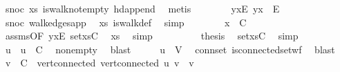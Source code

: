 \begin{isabellebody}
\ snoc\ xs\ is{\isacharunderscore}{\kern0pt}walk{\isacharunderscore}{\kern0pt}not{\isacharunderscore}{\kern0pt}empty{}\ hd{\isacharunderscore}{\kern0pt}append{}\ \isamarkupfalse%
\ metis\isanewline
\ \ \ \ \ \ \isamarkupfalse%
\ yx{\isacharunderscore}{\kern0pt}E{\isacharcolon}{\kern0pt}\ {\isachardoublequoteopen}{\isacharbraceleft}{\kern0pt}y{\isacharcomma}{\kern0pt}x{\isacharbraceright}{\kern0pt}\ {\isasymin}\ E{\isachardoublequoteclose}\ \isamarkupfalse%
\ snoc{\isacharparenleft}{\kern0pt}{}{\isacharparenright}{\kern0pt}\ walk{\isacharunderscore}{\kern0pt}edges{\isacharunderscore}{\kern0pt}app\ \isamarkupfalse%
\ xs\ is{\isacharunderscore}{\kern0pt}walk{\isacharunderscore}{\kern0pt}def\ \isamarkupfalse%
\ simp\isanewline
\ \ \ \ \ \ \isamarkupfalse%
\ {\isachardoublequoteopen}x\ {\isasymin}\ C{\isachardoublequoteclose}\ \isamarkupfalse%
\ assms{\isacharparenleft}{\kern0pt}{}{\isacharparenright}{\kern0pt}{\isacharbrackleft}{\kern0pt}OF\ yx{\isacharunderscore}{\kern0pt}E{\isacharbrackright}{\kern0pt}\ set{\isacharunderscore}{\kern0pt}xs{\isacharunderscore}{\kern0pt}C\ \isamarkupfalse%
\ xs\ \isamarkupfalse%
\ simp\isanewline
\ \ \ \ \ \ \isamarkupfalse%
\ \isamarkupfalse%
\ {\isacharquery}{\kern0pt}thesis\ \isamarkupfalse%
\ set{\isacharunderscore}{\kern0pt}xs{\isacharunderscore}{\kern0pt}C\ \isamarkupfalse%
\ simp\isanewline
\ \ \ \ \isamarkupfalse%
\isanewline
\ \ \isamarkupfalse%
\isanewline
\ \ \isamarkupfalse%
\ u\ \ {\isachardoublequoteopen}u\ {\isasymin}\ C{\isachardoublequoteclose}\ \isamarkupfalse%
\ non{\isacharunderscore}{\kern0pt}empty\ \isamarkupfalse%
\ blast\isanewline
\ \ \isamarkupfalse%
\ \isamarkupfalse%
\ {\isachardoublequoteopen}u\ {\isasymin}\ V{\isachardoublequoteclose}\ \isamarkupfalse%
\ conn{\isacharunderscore}{\kern0pt}set\ is{\isacharunderscore}{\kern0pt}connected{\isacharunderscore}{\kern0pt}set{\isacharunderscore}{\kern0pt}wf\ \isamarkupfalse%
\ blast\isanewline
\ \ \isamarkupfalse%
\ {\isachardoublequoteopen}v\ {\isasymin}\ C{\isachardoublequoteclose}\ \ vert{\isacharunderscore}{\kern0pt}connected{\isacharcolon}{\kern0pt}\ {\isachardoublequoteopen}vert{\isacharunderscore}{\kern0pt}connected\ u\ v{\isachardoublequoteclose}\ \ v\isanewline

\end{isabellebody}
